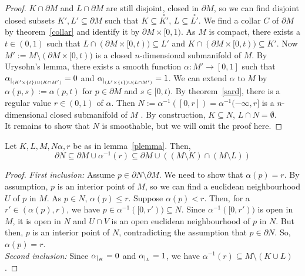 \documentclass[a4paper,11pt]{article}
\begin{document}
\begin{proof}\cite{conner}
    \(K\cap\partial M\) and \(L\cap\partial M\) are still disjoint, closed in \(\partial M\), so we can find disjoint closed subsets \(K',L'\subseteq\partial M\) such that \(K\subseteq\overset{\circ}{K'}\), \(L\subseteq\overset{\circ}{L'}\). 
    We find a collar \(C\) of \(\partial M\) by theorem\ \ref{collar} and identify it by \(\partial M\times[0,1)\). As \(M\) is compact, there exists a \(t\in (0,1)\) such that \(L\cap (\partial M\times [0,t))\subseteq L'\) and \(K\cap (\partial M\times [0,t))\subseteq K'\). 
    Now \(M':=M\setminus (\partial M\times [0,t))\) is a closed \(n\)-dimensional submanifold of \(M\). By Urysohn's lemma, there exists a smooth function \(\alpha:M'\to[0,1]\) such that \(\alpha_{|_{(K'\times \{t\})\cup (K\cap M')}}=0\) and \(\alpha_{|_{(L'\times \{t\})\cup(L\cap M')}}=1\). 
    We can extend \(\alpha\) to \(M\) by \(\alpha(p,s):=\alpha(p,t)\) for \(p\in \partial M\) and \(s\in[0,t)\). 
    By theorem\ \ref{sard}, there is a regular value \(r\in(0,1)\) of \(\alpha\). 
    Then \(N:=\alpha^{-1}([0,r])=\alpha^{-1}(-\infty,r]\) is a \(n\)-dimensional closed submanifold of \(M\)%
    . By construction, \(K\subseteq N\), \(L\cap N=\emptyset\).\\
    It remains to show that \(N\) is smoothable, but we will omit the proof here.
\end{proof}


\begin{lemma}\label{plemma2}
    Let \(K,L,M,N\alpha,r\) be as in lemma\ \ref{plemma}. Then,
    \[\partial N\subseteq \partial M\cup \alpha^{-1}(r)\subseteq \partial M\cup((M\setminus K)\cap(M\setminus L))\]
\end{lemma}

\begin{proof}\cite{zhang}
    \textit{First inclusion:} Assume \(p\in\partial N\setminus \partial M\). We need to show that \(\alpha(p)=r\). By assumption, \(p\) is an interior point of \(M\), so we can find a euclidean neighbourhood \(U\) of \(p\) in \(M\). 
    As \(p\in N\), \(\alpha(p)\leq r\). Suppose \(\alpha(p)<r\). Then, for a \(r'\in(\alpha(p),r)\), we have \(p\in\alpha^{-1}([0,r'))\subseteq N\). Since \(\alpha^{-1}([0,r'))\) is open in \(M\), it is open in \(N\) and \(U\cap V\) is an open euclidean neighbourhood of \(p\) in \(N\). But then, \(p\) is an interior point of \(N\), contradicting the assumption that \(p\in\partial N\). So, \(\alpha(p)=r\).\\
    \textit{Second inclusion:} Since \(\alpha_{|_{K}}=0\) and \(\alpha_{|_{L}}=1\), we have \(\alpha^{-1}(r)\subseteq M\setminus (K\cup L)\).
\end{proof}
\end{document}
